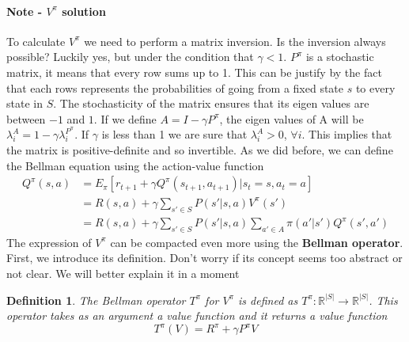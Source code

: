 \documentclass[main.tex]{subfiles}
\newtheorem{definition}{Definition}[section]
\begin{document}
\paragraph{Note - $V^{\pi}$ solution} To calculate $V^{\pi}$ we need to perform a matrix inversion. Is the inversion always possible? Luckily yes, but under the condition that $\gamma<1$. $P^{\pi}$ is a stochastic matrix, it means that every row sums up to 1. This can be justify by the fact that each rows represents the probabilities of going from a fixed state $s$ to every state in $S$. The stochasticity of the matrix ensures that its eigen values are between $-1$ and $1$. If we define $A = I - \gamma P^{\pi}$, the eigen values of A will be $\lambda_i^A = 1 - \gamma \lambda_i^{P^{\pi}}$. If $\gamma$ is less than 1 we are sure that $\lambda_i^A > 0$, $\forall i$. This implies that the matrix is positive-definite and so invertible.
\newline
\newline
As we did before, we can define the Bellman equation using the action-value function
\begin{align*}
    Q^{\pi}(s,a) & = E_{\pi}[r_{t+1} + \gamma Q^{\pi}(s_{t+1},a_{t+1})|s_t=s,a_t=a]                     \\
                 & = R(s,a) + \gamma \sum_{s' \in S} P(s'|s,a)V^{\pi}(s')                               \\
                 & = R(s,a) + \gamma \sum_{s' \in S} P(s'|s,a) \sum_{a' \in A} \pi(a'|s')Q^{\pi}(s',a')
\end{align*}
The expression of $V^{\pi}$ can be compacted even more using the \textbf{Bellman operator}.
First, we introduce its definition. Don't worry if its concept seems too abstract or not clear. We will better explain it in a moment
\begin{definition}
    The Bellman operator $T^{\pi}$ for $V^{\pi}$ is defined as $T^{\pi}:\mathbb{R}^{|S|} \rightarrow \mathbb{R}^{|S|}$. This operator takes as an argument a value function and it returns a value function \footnotemark {}
    \begin{equation*}
        T^{\pi}(V) = R^{\pi} + \gamma P^{\pi} V
    \end{equation*}
\end{definition}
\end{document}

